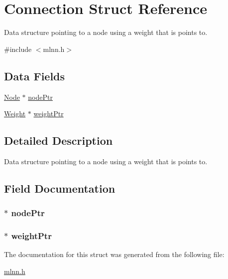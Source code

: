 \hypertarget{struct_connection}{}\section{Connection Struct Reference}
\label{struct_connection}


Data structure pointing to a node using a weight that is points to.  




{\ttfamily \#include $<$mlnn.\+h$>$}

\subsection*{Data Fields}
\begin{DoxyCompactItemize}
\item 
\hyperlink{struct_node}{Node} $\ast$ \hyperlink{struct_connection_a3faa6359b3379a1c9088a2ef71e9de70}{node\+Ptr}
\item 
\hyperlink{mlnn_8h_a5b53e5716aeadbb040a52c9c8c124c74}{Weight} $\ast$ \hyperlink{struct_connection_a94fe55945a237accd942dad1aee52683}{weight\+Ptr}
\end{DoxyCompactItemize}


\subsection{Detailed Description}
Data structure pointing to a node using a weight that is points to. 

\subsection{Field Documentation}
\hypertarget{struct_connection_a3faa6359b3379a1c9088a2ef71e9de70}{}
\subsubsection[{node\+Ptr}]{$\ast$ node\+Ptr}\label{struct_connection_a3faa6359b3379a1c9088a2ef71e9de70}
\hypertarget{struct_connection_a94fe55945a237accd942dad1aee52683}{}
\subsubsection[{weight\+Ptr}]{$\ast$ weight\+Ptr}\label{struct_connection_a94fe55945a237accd942dad1aee52683}


The documentation for this struct was generated from the following file\+:\begin{DoxyCompactItemize}
\item 
\hyperlink{mlnn_8h}{mlnn.\+h}\end{DoxyCompactItemize}
